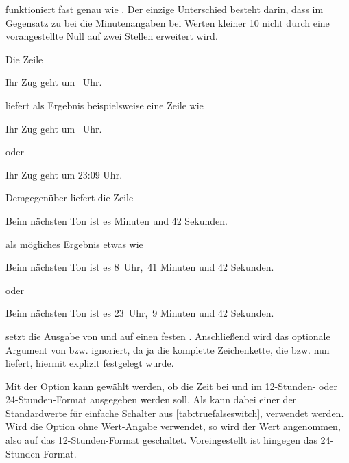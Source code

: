  funktioniert fast genau wie . Der
einzige Unterschied besteht darin, dass im Gegensatz zu
 bei  die Minutenangaben bei Werten
kleiner 10 nicht durch eine vorangestellte Null auf zwei Stellen
erweitert wird.
\begin{Example}
  Die Zeile
\begin{lstcode}
  Ihr Zug geht um \thistime\ Uhr.
\end{lstcode}
  liefert als Ergebnis beispielsweise eine Zeile wie
  \begin{ShowOutput}
    Ihr Zug geht um \thistime\ Uhr.
  \end{ShowOutput}
  oder
  \begin{ShowOutput}
    Ihr Zug geht um 23:09 Uhr.
  \end{ShowOutput}
  Demgegenüber liefert die Zeile
\begin{lstcode}
  Beim nächsten Ton ist es \thistime*[\ Uhr,\ ] 
  Minuten und 42 Sekunden.
\end{lstcode}
  als mögliches Ergebnis etwas wie
  \begin{ShowOutput}
    Beim nächsten Ton ist es 8\ Uhr,\ 41 Minuten und 42 Sekunden.
  \end{ShowOutput}
  oder
  \begin{ShowOutput}
    Beim nächsten Ton ist es 23\ Uhr,\ 9 Minuten und 42 Sekunden.
  \end{ShowOutput}
\end{Example}
\EndIndexGroup
\ExampleEndFix


\begin{Declaration}%
\end{Declaration}%
 setzt die Ausgabe von
 und  auf einen
festen %
. %
Anschließend wird das optionale Argument von 
bzw.   ignoriert, da ja die komplette
Zeichenkette, die 
bzw.  nun liefert, hiermit explizit festgelegt
wurde.%
\EndIndexGroup


\begin{Declaration}
\end{Declaration}%
%
Mit der Option  kann gewählt
werden, ob die Zeit bei  und
 im 12-Stunden- oder 24-Stunden-Format
ausgegeben werden soll. Als  kann dabei einer der
Standardwerte für einfache Schalter aus \autoref{tab:truefalseswitch},
 verwendet werden. Wird die Option ohne
Wert-Angabe verwendet, so wird der Wert  angenommen, also auf das
12-Stunden-Format geschaltet.  Voreingestellt ist
hingegen das 24-Stunden-Format.%

